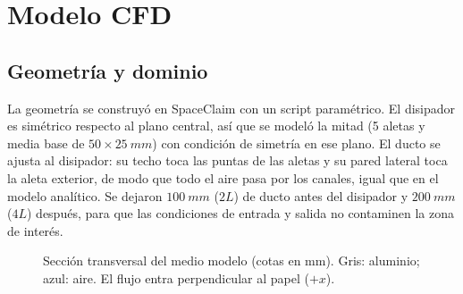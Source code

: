\documentclass[11pt,letterpaper]{article}
\begin{document}
\section{Modelo CFD}
\label{sec:modelo}
\subsection{Geometría y dominio}
La geometría se construyó en SpaceClaim con un script paramétrico. El disipador es simétrico respecto al plano central, así que se modeló la mitad (5 aletas y media base de $50\times\SI{25}{mm}$) con condición de simetría en ese plano. El ducto se ajusta al disipador: su techo toca las puntas de las aletas y su pared lateral toca la aleta exterior, de modo que todo el aire pasa por los canales, igual que en el modelo analítico. Se dejaron $\SI{100}{mm}$ ($2L$) de ducto antes del disipador y $\SI{200}{mm}$ ($4L$) después, para que las condiciones de entrada y salida no contaminen la zona de interés.

\begin{figure}[H]
\centering
{}
\caption{Sección transversal del medio modelo (cotas en mm). Gris: aluminio; azul: aire. El flujo entra perpendicular al papel ($+x$).}
\label{fig:seccion}
\end{figure}
\end{document}
